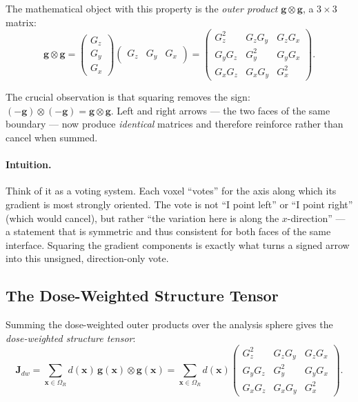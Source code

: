 \documentclass[11pt,a4paper]{article}
\newcommand{\vx}{\mathbf{x}}
\newcommand{\vg}{\mathbf{g}}
\newcommand{\vJ}{\mathbf{J}}
\begin{document}
The mathematical object with this property is the \emph{outer product}
$\vg \otimes \vg$, a $3\times 3$ matrix:
\begin{equation}
    \vg \otimes \vg
    =
    \begin{pmatrix} G_z \\ G_y \\ G_x \end{pmatrix}
    \begin{pmatrix} G_z & G_y & G_x \end{pmatrix}
    =
    \begin{pmatrix}
        G_z^2   & G_z G_y & G_z G_x \\
        G_y G_z & G_y^2   & G_y G_x \\
        G_x G_z & G_x G_y & G_x^2
    \end{pmatrix}.
\end{equation}

The crucial observation is that squaring removes the sign:
$(-\vg)\otimes(-\vg) = \vg\otimes\vg$.
Left and right arrows — the two faces of the same boundary — now produce
\emph{identical} matrices and therefore reinforce rather than cancel when
summed.

\paragraph{Intuition.}
Think of it as a voting system.
Each voxel ``votes'' for the axis along which its gradient is most strongly
oriented.
The vote is not ``I point left'' or ``I point right'' (which would cancel),
but rather ``the variation here is along the $x$-direction'' — a statement
that is symmetric and thus consistent for both faces of the same interface.
Squaring the gradient components is exactly what turns a signed arrow into
this unsigned, direction-only vote.

\subsection{The Dose-Weighted Structure Tensor}

Summing the dose-weighted outer products over the analysis sphere gives the
\emph{dose-weighted structure tensor}:
\begin{equation}
    \boxed{
    \vJ_{dw}
    = \sum_{\vx \in \Omega_R} d(\vx)\,\vg(\vx)\otimes\vg(\vx)
    = \sum_{\vx \in \Omega_R} d(\vx)
        \begin{pmatrix}
            G_z^2   & G_z G_y & G_z G_x \\
            G_y G_z & G_y^2   & G_y G_x \\
            G_x G_z & G_x G_y & G_x^2
        \end{pmatrix}.
    }
    \label{eq:structure_tensor}
\end{equation}
\end{document}
